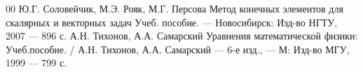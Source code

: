 \documentclass[14pt,a4paper]{extreport}
\begin{document}


%

\newpage

\newpage

\setcounter{page}{3}

%


%
%

\newpage

\renewcommand\bibname{СПИСОК ЛИТЕРАТУРЫ}

\begin{thebibliography}{00}
			Ю.Г. Соловейчик, М.Э. Рояк, М.Г. Персова Метод конечных элементов для скалярных и векторных задач Учеб. пособие. — Новосибирск: Изд-во НГТУ, 2007 — 896 с.
            А.Н. Тихонов, А.А. Самарский Уравнения математической физики: Учеб.пособие. / А.Н. Тихонов, А.А. Самарский — 6-е изд., — М: Изд-во МГУ, 1999 — 799 с.
\end{thebibliography}

\newpage

\end{document}
